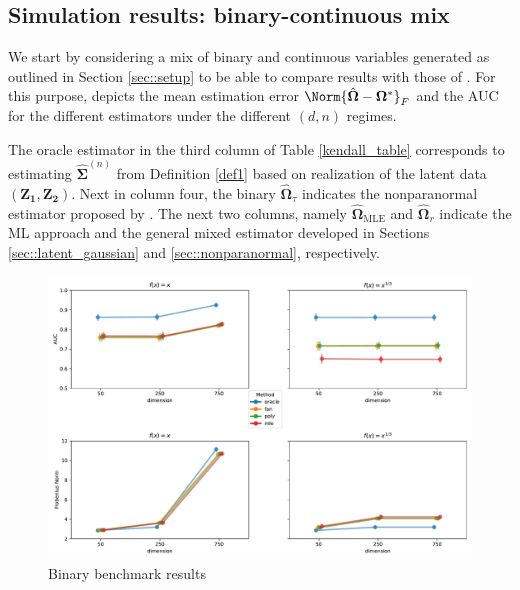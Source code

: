 \subsection{Simulation results: binary-continuous mix}

We start by considering a mix of binary and continuous variables generated as outlined in Section \ref{sec::setup} to be able to compare results with those of \citet{Fan17}. For this purpose,  depicts the mean estimation error $\Norm{\hat{\boldsymbol\Omega} - \boldsymbol\Omega^*}_F$ and the AUC for the different estimators under the different $(d,n)$ regimes.

The oracle estimator in the third column of Table \ref{kendall_table} corresponds to estimating $\hat{\boldsymbol\Sigma}^{(n)}$ from Definition \ref{def1} based on realization of the latent data $(\boldsymbol{Z_1},\boldsymbol{Z_2})$. Next in column four, the binary $\hat{\boldsymbol\Omega}_\tau$ indicates the nonparanormal estimator proposed by \citet{Fan17}. The next two columns, namely $\hat{\boldsymbol\Omega}_{\text{MLE}}$ and $\hat{\boldsymbol\Omega}_r$ indicate the ML approach and the general mixed estimator developed in Sections \ref{sec::latent_gaussian} and \ref{sec::nonparanormal}, respectively.
%

\begin{figure}
    \centering
    \includegraphics[width=\textwidth]{Figures/binary.pdf}
    \caption{Binary benchmark results}
    \label{fig:bench_binary}
\end{figure}

